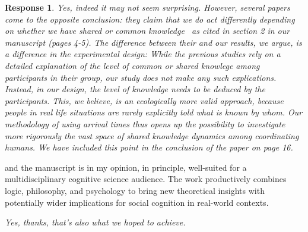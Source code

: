 \documentclass[a4paper]{article}
\newtheorem{response}{Response}
\begin{document}
\begin{response}
Yes, indeed it may not seem surprising. However, several papers come to the opposite conclusion: they claim that we \emph{do} act differently depending on whether we have shared or common knowledge~\cite{rubinstein1989electronic, lee2010rationales, thomas2014psychology, thomas2016recursive, thomas2018common, de2019common, de2019maimonides} as cited in section 2 in our manuscript (pages 4-5). The difference between their and our results, we argue, is a difference in the experimental design: While the previous studies rely on a detailed explanation of the level of common or shared knowlege among participants in their group, our study does not make any such explications. Instead, in our design, the level of knowledge needs to be \emph{deduced} by the participants. This, we believe, is an ecologically more valid approach, because people in real life situations are rarely explicitly told what is known by whom. Our methodology of using arrival times thus opens up the possibility to investigate more rigorously the vast space of shared knowledge dynamics among coordinating humans. We have included this point in the conclusion of the paper on page 16.
\end{response} 

 and the manuscript is in my opinion, in principle, well-suited for a multidisciplinary cognitive science audience. The work productively combines logic, philosophy, and psychology to bring new theoretical insights with potentially wider implications for social cognition in real-world contexts.
 
 \medskip
{\noindent \itshape
Yes, thanks, that's also what we hoped to achieve.
}
\end{document}
